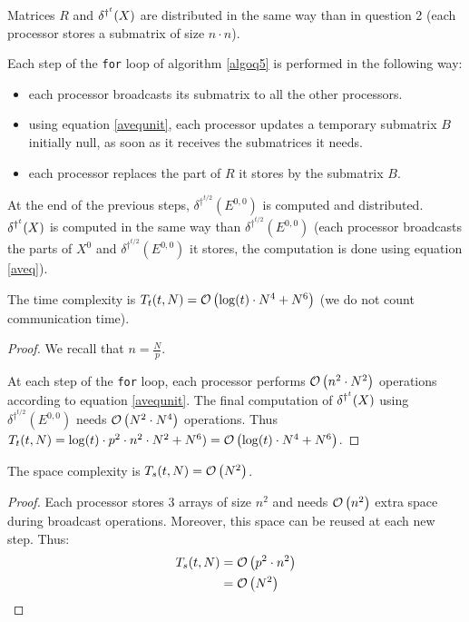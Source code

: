 Matrices $R$ and $\delta^{\dag^t}(X)$ are distributed in the same way than in question 2 (each processor stores a submatrix of size $n \cdot n$).

Each step of the \texttt{for} loop of algorithm \ref{algoq5} is performed in the following way:
\begin{itemize}
 \item each processor broadcasts its submatrix to all the other processors.
 \item using equation \ref{avequnit}, each processor updates a temporary submatrix $B$ initially null, as soon as it receives the submatrices it needs.
 \item each processor replaces the part of $R$ it stores by the submatrix $B$.
\end{itemize}

At the end of the previous steps, $\delta^{\dag^{t/2}}(E^{0,0})$ is computed and distributed. $\delta^{\dag^t}(X)$ is computed in the same way than $\delta^{\dag^{t/2}}(E^{0,0})$ (each processor broadcasts the parts of $X^0$ and $\delta^{\dag^{t/2}}(E^{0,0})$ it stores, the computation is done using equation \ref{aveq}).

\begin{prop}
 The time complexity is $T_t(t,N) = \mathcal O \left( \log(t) \cdot N^4 + N^6 \right)$ (we do not count communication time).
\end{prop}

\begin{proof}
 We recall that $n = \frac{N}{p}$.
 
  At each step of the \texttt{for} loop, each processor performs $\mathcal O \left( n^2 \cdot N^2 \right)$ operations according to equation \ref{avequnit}. The final computation of $\delta^{\dag^t}(X)$ using $\delta^{\dag^{t/2}}(E^{0,0})$ needs $\mathcal O \left( N^2 \cdot N^4 \right)$ operations. Thus $T_t(t,N) = \log(t) \cdot p^2 \cdot n^2 \cdot N^2 + N^6) = \mathcal O \left( \log(t) \cdot N^4 + N^6 \right)$.
\end{proof}

\begin{prop}
 The space complexity is $T_s(t,N) = \mathcal O \left( N^2 \right)$.
\end{prop}

\begin{proof}
 Each processor stores 3 arrays of size $n^2$ and needs $\mathcal O \left( n^2 \right)$ extra space during broadcast operations. Moreover, this space can be reused at each new step. Thus:
  \[
    \begin{split}
        T_s(t,N) & = \mathcal O \left( p^2 \cdot n^2 \right)\\
                 & = \mathcal O \left( N^2 \right)
    \end{split}
 \] 
\end{proof}

